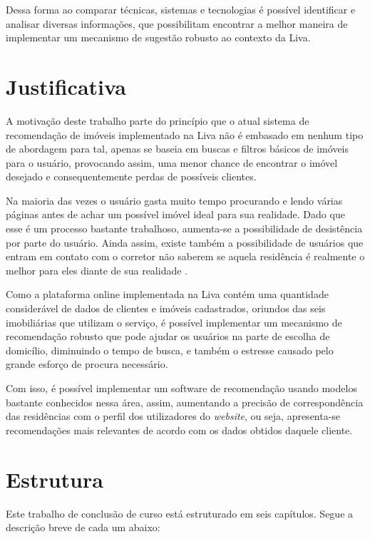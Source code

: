  Dessa forma ao comparar técnicas, sistemas e tecnologias é possível identificar e analisar diversas informações, que possibilitam encontrar a melhor maneira de implementar um mecanismo de sugestão robusto ao contexto da Liva.

\section{Justificativa}

A motivação deste trabalho parte do princípio que o atual sistema de recomendação de imóveis implementado na Liva não é embasado em nenhum tipo de abordagem para tal, apenas se baseia em buscas e filtros básicos de imóveis para o usuário, provocando assim, uma menor chance de encontrar o imóvel desejado e consequentemente perdas de possíveis clientes.

Na maioria das vezes o usuário gasta muito tempo procurando e lendo várias páginas antes de achar um possível imóvel ideal para sua realidade. Dado que esse é um processo bastante trabalhoso, aumenta-se a possibilidade de desistência por parte do usuário. Ainda assim, existe também a possibilidade de usuários que entram em contato com o corretor não saberem se aquela residência é realmente o melhor para eles diante de sua realidade \cite{Summo:2017}.

Como a plataforma online implementada na Liva contém uma quantidade considerável de dados de clientes e imóveis cadastrados, oriundos das seis imobiliárias que utilizam o serviço, é possível implementar um mecanismo de recomendação robusto que pode ajudar os usuários na parte de escolha de domicílio, diminuindo o tempo de busca, e também o estresse causado pelo grande esforço de procura necessário.

Com isso, é possível implementar um software de recomendação usando modelos bastante conhecidos nessa área, assim, aumentando a precisão de correspondência das residências com o perfil dos utilizadores do \textit{website}, ou seja, apresenta-se recomendações mais relevantes de acordo com os dados obtidos daquele cliente.


\section{Estrutura}

Este trabalho de conclusão de curso está estruturado em seis capítulos. Segue a descrição breve de cada um abaixo:

